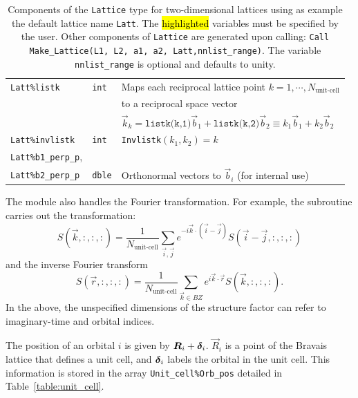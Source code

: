 \begin{table}[h!]
\begin{center}
\begin{tabular}{@{} l l @{$\;\;$} l @{}}
    \texttt{Latt\%listk}                               & \texttt{int}   &  Maps each reciprocal lattice point $k=1,\cdots, N_{\text{unit-cell}}$\\
                                                                   &    & to a reciprocal space vector\\
                                                                   &    & $\vec{k}_k= \texttt{listk(k,1)} \vec{b}_1 +  \texttt{listk(k,2)} \vec{b}_2  \equiv k_1  \vec{b}_1 +   k_2  \vec{b}_2 $ \\
    \texttt{Latt\%invlistk}                            & \texttt{int}   &   \texttt{Invlistk}$(k_1,k_2) = k $ \\
   \texttt{Latt\%b1\_perp\_p},                         &                & \\ 
   \texttt{Latt\%b2\_perp\_p}                          & \texttt{dble}  &  Orthonormal vectors to $\vec{b}_i$ (for internal use) \\\bottomrule
   \end{tabular}
   \caption{Components of the \texttt{Lattice} type for two-dimensional lattices using as example the default lattice name \texttt{Latt}.
   The \hl{highlighted} variables must be specified by the user.  Other components of \texttt{Lattice} are generated upon calling: \texttt{Call Make\_Lattice(L1, L2, a1, a2, Latt,nnlist\_range)}.   The variable \texttt{nnlist\_range} is optional and defaults to unity.
    \label{table:lattice}}
\end{center}
\end{table}
%

The  module also handles the Fourier transformation.  For example,  the  subroutine     carries out the  transformation: 
\begin{equation}
\label{eq:fourier_transform}
	S(\vec{k}, :,:,:) =  \frac{1}{N_\text{unit-cell}}  \sum_{\vec{i},\vec{j}}   e^{-i \vec{k} \cdot \left( \vec{i}-\vec{j} \right)} S(\vec{i}  - \vec{j}, :,:,:)
\end{equation}
and    the  inverse Fourier transform 
 \begin{equation}
	S(\vec{r}, :,:,:) =  \frac{1}{N_\text{unit-cell}}  \sum_{\vec{k} \in BZ }   e^{ i \vec{k} \cdot \vec{r}} S(\vec{k}, :,:,:).
\end{equation}
In the above,   the unspecified dimensions of  the structure factor can refer  to imaginary-time  and orbital indices. 

The position of an orbital  $i$  is given by   $\boldsymbol{R}_i +   \boldsymbol{\delta}_i $.   $\vec{R}_i $ is a point of the Bravais lattice that defines a unit cell,  and  $ \boldsymbol{\delta}_i $  labels the orbital in the unit cell. This information is stored in the array
\texttt{Unit\_cell\%Orb\_pos}    detailed in Table~\ref{table:unit_cell}. 

